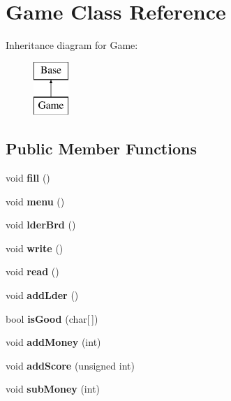 \hypertarget{class_game}{}\section{Game Class Reference}
\label{class_game}
Inheritance diagram for Game\+:\begin{figure}[H]
\begin{center}
\leavevmode
\includegraphics[height=2.000000cm]{class_game}
\end{center}
\end{figure}
\subsection*{Public Member Functions}
\begin{DoxyCompactItemize}
\item 
\hypertarget{class_game_a49ded379e279ea868437560d8ac10fdb}{}\label{class_game_a49ded379e279ea868437560d8ac10fdb} 
void {\bfseries fill} ()
\item 
\hypertarget{class_game_a463932fa7ca2f1ce243279bf2422fc48}{}\label{class_game_a463932fa7ca2f1ce243279bf2422fc48} 
void {\bfseries menu} ()
\item 
\hypertarget{class_game_a01f5f6eebc3fe2d069c8e44227fb1b1e}{}\label{class_game_a01f5f6eebc3fe2d069c8e44227fb1b1e} 
void {\bfseries lder\+Brd} ()
\item 
\hypertarget{class_game_a75085a377fc907a1b988378434b01f19}{}\label{class_game_a75085a377fc907a1b988378434b01f19} 
void {\bfseries write} ()
\item 
\hypertarget{class_game_a109442fa16afc0dcb542d88a086aa5ed}{}\label{class_game_a109442fa16afc0dcb542d88a086aa5ed} 
void {\bfseries read} ()
\item 
\hypertarget{class_game_abe4a583fc8cbb16b634735a59a654e73}{}\label{class_game_abe4a583fc8cbb16b634735a59a654e73} 
void {\bfseries add\+Lder} ()
\item 
\hypertarget{class_game_a08052a1f1c2a02a44f3de00a334aff28}{}\label{class_game_a08052a1f1c2a02a44f3de00a334aff28} 
bool {\bfseries is\+Good} (char\mbox{[}$\,$\mbox{]})
\item 
\hypertarget{class_game_a74d0dca3ae7da72eccb6a3e9eaefc2c5}{}\label{class_game_a74d0dca3ae7da72eccb6a3e9eaefc2c5} 
void {\bfseries add\+Money} (int)
\item 
\hypertarget{class_game_a76486d4a6561979d42f460686237e50a}{}\label{class_game_a76486d4a6561979d42f460686237e50a} 
void {\bfseries add\+Score} (unsigned int)
\item 
\hypertarget{class_game_a57c81811f28e95c566bc6444f4c18999}{}\label{class_game_a57c81811f28e95c566bc6444f4c18999} 
void {\bfseries sub\+Money} (int)
\end{DoxyCompactItemize}
